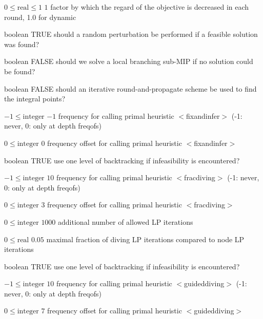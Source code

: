 %
{$0\leq\textrm{real}\leq1$}%
{$1$}%
{factor by which the regard of the objective is decreased in each round, 1.0 for dynamic}%
{}

%
{boolean}%
{TRUE}%
{should a random perturbation be performed if a feasible solution was found?}%
{}

%
{boolean}%
{FALSE}%
{should we solve a local branching sub-MIP if no solution could be found?}%
{}

%
{boolean}%
{FALSE}%
{should an iterative round-and-propagate scheme be used to find the integral points?}%
{}

%
{$-1\leq\textrm{integer}$}%
{$-1$}%
{frequency for calling primal heuristic $<$fixandinfer$>$ (-1: never, 0: only at depth freqofs)}%
{}

%
{$0\leq\textrm{integer}$}%
{$0$}%
{frequency offset for calling primal heuristic $<$fixandinfer$>$}%
{}

%
{boolean}%
{TRUE}%
{use one level of backtracking if infeasibility is encountered?}%
{}

%
{$-1\leq\textrm{integer}$}%
{$10$}%
{frequency for calling primal heuristic $<$fracdiving$>$ (-1: never, 0: only at depth freqofs)}%
{}

%
{$0\leq\textrm{integer}$}%
{$3$}%
{frequency offset for calling primal heuristic $<$fracdiving$>$}%
{}

%
{$0\leq\textrm{integer}$}%
{$1000$}%
{additional number of allowed LP iterations}%
{}

%
{$0\leq\textrm{real}$}%
{$0.05$}%
{maximal fraction of diving LP iterations compared to node LP iterations}%
{}

%
{boolean}%
{TRUE}%
{use one level of backtracking if infeasibility is encountered?}%
{}

%
{$-1\leq\textrm{integer}$}%
{$10$}%
{frequency for calling primal heuristic $<$guideddiving$>$ (-1: never, 0: only at depth freqofs)}%
{}

%
{$0\leq\textrm{integer}$}%
{$7$}%
{frequency offset for calling primal heuristic $<$guideddiving$>$}%
{}

